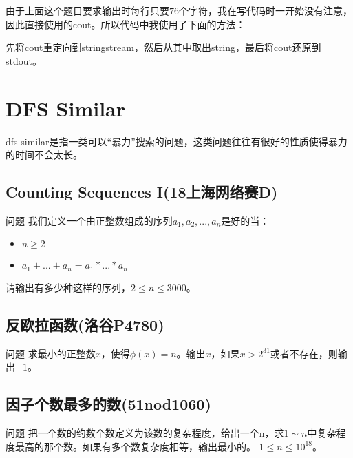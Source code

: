 

\begin{note}
	由于上面这个题目要求输出时每行只要$76$个字符，我在写代码时一开始没有注意，因此直接使用的cout。所以代码中我使用了下面的方法：
	
	
	先将cout重定向到stringstream，然后从其中取出string，最后将cout还原到stdout。
\end{note}

\section{DFS Similar}
dfs similar是指一类可以“暴力”搜索的问题，这类问题往往有很好的性质使得暴力的时间不会太长。

\subsection{Counting Sequences I(18上海网络赛D)}
\begin{custom}{问题}
我们定义一个由正整数组成的序列$a_1,a_2,...,a_n$是好的当：
\begin{itemize}
\item $n\ge2$
\item $a_1+...+a_n = a_1*...*a_n$
\end{itemize}
请输出有多少种这样的序列，$2\le n \le 3000$。
\end{custom}




\subsection{反欧拉函数(洛谷P4780)}
\begin{custom}{问题}
求最小的正整数$x$，使得$\phi(x)=n$。输出$x$，如果$x>2^{31}$或者不存在，则输出$-1$。
\end{custom}




\subsection{因子个数最多的数(51nod1060)}
\begin{custom}{问题}
把一个数的约数个数定义为该数的复杂程度，给出一个n，求$1\sim n$中复杂程度最高的那个数。如果有多个数复杂度相等，输出最小的。
$1\le n\le 10^{18}$。
\end{custom}

